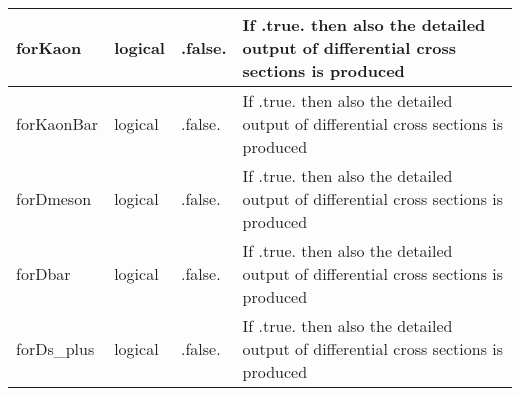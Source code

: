 \documentclass{article}
\begin{document}
\begin{longtable}{llll}
\midrule
forKaon & \begin{minipage}[t]{2cm}logical\end{minipage} & \begin{minipage}[t]{2cm}.false.\end{minipage} & \begin{minipage}[t]{12cm}If .true. then also the detailed output of differential cross sections is produced\end{minipage}\\*
\midrule
forKaonBar & \begin{minipage}[t]{2cm}logical\end{minipage} & \begin{minipage}[t]{2cm}.false.\end{minipage} & \begin{minipage}[t]{12cm}If .true. then also the detailed output of differential cross sections is produced\end{minipage}\\*
\midrule
forDmeson & \begin{minipage}[t]{2cm}logical\end{minipage} & \begin{minipage}[t]{2cm}.false.\end{minipage} & \begin{minipage}[t]{12cm}If .true. then also the detailed output of differential cross sections is produced\end{minipage}\\*
\midrule
forDbar & \begin{minipage}[t]{2cm}logical\end{minipage} & \begin{minipage}[t]{2cm}.false.\end{minipage} & \begin{minipage}[t]{12cm}If .true. then also the detailed output of differential cross sections is produced\end{minipage}\\*
\midrule
forDs\_plus & \begin{minipage}[t]{2cm}logical\end{minipage} & \begin{minipage}[t]{2cm}.false.\end{minipage} & \begin{minipage}[t]{12cm}If .true. then also the detailed output of differential cross sections is produced\end{minipage}\\*

\end{longtable}
\end{document}
